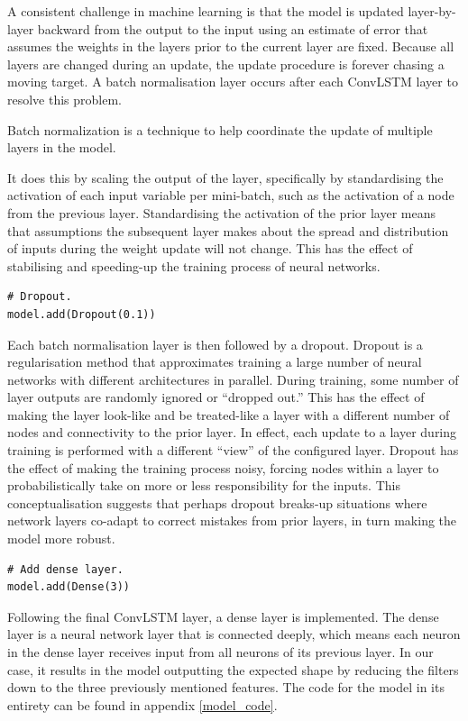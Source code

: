 A consistent challenge in machine learning is that the model is updated layer-by-layer backward from the output to the input using an estimate of error that assumes the weights in the layers prior to the current layer are fixed. Because all layers are changed during an update, the update procedure is forever chasing a moving target. A batch normalisation layer occurs after each ConvLSTM layer to resolve this problem.  

\begin{definition}
Batch normalization is a technique to help coordinate the update of multiple layers in the model.
\end{definition}

It does this by scaling the output of the layer, specifically by standardising the activation of each input variable per mini-batch, such as the activation of a node from the previous layer. Standardising the activation of the prior layer means that assumptions the subsequent layer makes about the spread and distribution of inputs during the weight update will not change. This has the effect of stabilising and speeding-up the training process of neural networks\cite{batch_normalization}.

\begin{verbatim}
# Dropout.
model.add(Dropout(0.1))
\end{verbatim}

Each batch normalisation layer is then followed by a dropout. Dropout is a regularisation method that approximates training a large number of neural networks with different architectures in parallel. During training, some number of layer outputs are randomly ignored or “dropped out.” This has the effect of making the layer look-like and be treated-like a layer with a different number of nodes and connectivity to the prior layer. In effect, each update to a layer during training is performed with a different “view” of the configured layer. Dropout has the effect of making the training process noisy, forcing nodes within a layer to probabilistically take on more or less responsibility for the inputs. This conceptualisation suggests that perhaps dropout breaks-up situations where network layers co-adapt to correct mistakes from prior layers, in turn making the model more robust\cite{dropout}.

\begin{verbatim}
# Add dense layer.
model.add(Dense(3))
\end{verbatim}

Following the final ConvLSTM layer, a dense layer is implemented. The dense layer is a neural network layer that is connected deeply, which means each neuron in the dense layer receives input from all neurons of its previous layer\cite{dense}. In our case, it results in the model outputting the expected shape by reducing the filters down to the three previously mentioned features. The code for the model in its entirety can be found in appendix \ref{model_code}. 
